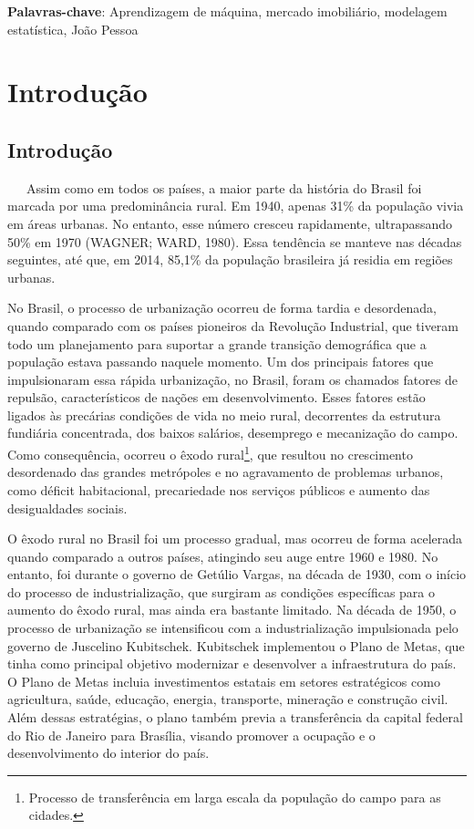 \documentclass[
  12pt,
  a4paper,
]{scrreprt}
\begin{document}
\begin{flushleft}
\textbf{Palavras-chave}: Aprendizagem de máquina, mercado imobiliário, modelagem estatística, João Pessoa
\end{flushleft}

\chapter{Introdução}\label{introduuxe7uxe3o}

\section{Introdução}\label{introduuxe7uxe3o-1}

~~~Assim como em todos os países, a maior parte da história do Brasil
foi marcada por uma predominância rural. Em 1940, apenas 31\% da
população vivia em áreas urbanas. No entanto, esse número cresceu
rapidamente, ultrapassando 50\% em 1970 (WAGNER; WARD, 1980). Essa
tendência se manteve nas décadas seguintes, até que, em 2014, 85,1\% da
população brasileira já residia em regiões urbanas.

\vspace{12pt}

No Brasil, o processo de urbanização ocorreu de forma tardia e
desordenada, quando comparado com os países pioneiros da Revolução
Industrial, que tiveram todo um planejamento para suportar a grande
transição demográfica que a população estava passando naquele momento.
Um dos principais fatores que impulsionaram essa rápida urbanização, no
Brasil, foram os chamados fatores de repulsão, característicos de nações
em desenvolvimento. Esses fatores estão ligados às precárias condições
de vida no meio rural, decorrentes da estrutura fundiária concentrada,
dos baixos salários, desemprego e mecanização do campo. Como
consequência, ocorreu o êxodo rural\footnote{Processo de transferência
  em larga escala da população do campo para as cidades.}, que resultou
no crescimento desordenado das grandes metrópoles e no agravamento de
problemas urbanos, como déficit habitacional, precariedade nos serviços
públicos e aumento das desigualdades sociais.

\vspace{12pt}

O êxodo rural no Brasil foi um processo gradual, mas ocorreu de forma
acelerada quando comparado a outros países, atingindo seu auge entre
1960 e 1980. No entanto, foi durante o governo de Getúlio Vargas, na
década de 1930, com o início do processo de industrialização, que
surgiram as condições específicas para o aumento do êxodo rural, mas
ainda era bastante limitado. Na década de 1950, o processo de
urbanização se intensificou com a industrialização impulsionada pelo
governo de Juscelino Kubitschek. Kubitschek implementou o Plano de
Metas, que tinha como principal objetivo modernizar e desenvolver a
infraestrutura do país. O Plano de Metas incluia investimentos estatais
em setores estratégicos como agricultura, saúde, educação, energia,
transporte, mineração e construção civil. Além dessas estratégias, o
plano também previa a transferência da capital federal do Rio de Janeiro
para Brasília, visando promover a ocupação e o desenvolvimento do
interior do país.
\end{document}
